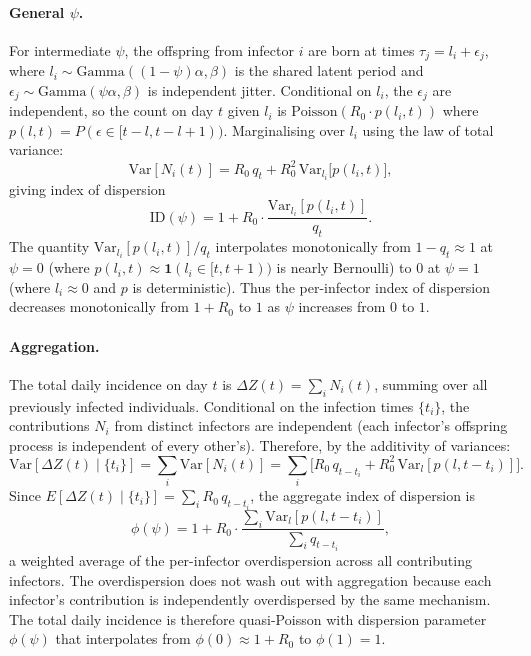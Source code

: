 \paragraph{General $\psi$.} For intermediate $\psi$, the offspring from infector $i$ are born at times $\tau_j = l_i + \epsilon_j$, where $l_i \sim \text{Gamma}((1-\psi)\alpha, \beta)$ is the shared latent period and $\epsilon_j \sim \text{Gamma}(\psi\alpha, \beta)$ is independent jitter. Conditional on $l_i$, the $\epsilon_j$ are independent, so the count on day $t$ given $l_i$ is $\text{Poisson}(R_0 \cdot p(l_i, t))$ where $p(l, t) = P(\epsilon \in [t - l, t - l + 1))$. Marginalising over $l_i$ using the law of total variance:
%
\begin{equation}
	\text{Var}[N_i(t)] = R_0 \, q_t + R_0^2 \, \text{Var}_{l_i}\bigl[p(l_i, t)\bigr],
\end{equation}
%
giving index of dispersion
%
\begin{equation}
	\text{ID}(\psi) = 1 + R_0 \cdot \frac{\text{Var}_{l_i}[p(l_i, t)]}{q_t}.
	\label{eq:id_psi}
\end{equation}
%
The quantity $\text{Var}_{l_i}[p(l_i, t)] / q_t$ interpolates monotonically from $1 - q_t \approx 1$ at $\psi = 0$ (where $p(l_i, t) \approx \mathbf{1}(l_i \in [t, t+1))$ is nearly Bernoulli) to $0$ at $\psi = 1$ (where $l_i \approx 0$ and $p$ is deterministic). Thus the per-infector index of dispersion decreases monotonically from $1 + R_0$ to $1$ as $\psi$ increases from $0$ to $1$.

\paragraph{Aggregation.} The total daily incidence on day $t$ is $\Delta Z(t) = \sum_i N_i(t)$, summing over all previously infected individuals. Conditional on the infection times $\{t_i\}$, the contributions $N_i$ from distinct infectors are independent (each infector's offspring process is independent of every other's). Therefore, by the additivity of variances:
%
\begin{equation}
	\text{Var}[\Delta Z(t) \mid \{t_i\}] = \sum_i \text{Var}[N_i(t)] = \sum_i \bigl[R_0 \, q_{t-t_i} + R_0^2 \, \text{Var}_l[p(l, t-t_i)]\bigr].
\end{equation}
%
Since $E[\Delta Z(t) \mid \{t_i\}] = \sum_i R_0 \, q_{t-t_i}$, the aggregate index of dispersion is
%
\begin{equation}
	\phi(\psi) = 1 + R_0 \cdot \frac{\sum_i \text{Var}_l[p(l, t - t_i)]}{\sum_i q_{t-t_i}},
\end{equation}
%
a weighted average of the per-infector overdispersion across all contributing infectors. The overdispersion does not wash out with aggregation because each infector's contribution is independently overdispersed by the same mechanism. The total daily incidence is therefore quasi-Poisson with dispersion parameter $\phi(\psi)$ that interpolates from $\phi(0) \approx 1 + R_0$ to $\phi(1) = 1$.

